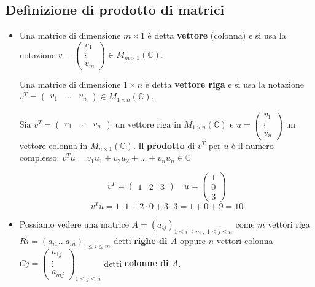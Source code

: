 \documentclass[a4paper]{article}
\theoremstyle{break}
\theoremstyle{break}
\theoremstyle{break}
\theoremstyle{break}
\begin{document}
\subsection{Definizione di prodotto di matrici}
\begin{itemize}
\item Una matrice di dimensione \( m \times 1 \) è detta \textbf{vettore} (colonna) e
si usa la notazione \( v = \begin{pmatrix} v_1 \\ \vdots \\ v_m \end{pmatrix} \in M_{m \times 1}(\mathbb{C})  \).

Una matrice di dimensione \( 1 \times n \) è detta \textbf{vettore riga} e si usa la notazione
\( v^T = \begin{pmatrix} v_1 & \ldots & v_n \end{pmatrix} \in M_{1 \times n}(\mathbb{C}) \).

Sia \( v^T = \begin{pmatrix} v_1 & \ldots & v_n \end{pmatrix} \)  un vettore riga
in \( M_{1 \times n}(\mathbb{C}) \) e \( u = \begin{pmatrix} v_1 \\ \vdots \\ v_n \end{pmatrix} \)
un vettore colonna in \( M_{n \times 1}(\mathbb{C}) \). Il \textbf{prodotto} di \( v^T \) per \( u \) è
il numero complesso: \( v^Tu = v_1u_1 + v_2u_2 + \ldots + v_nu_n \in \mathbb{C} \) 

\begin{example}
  \[
    v^T=\begin{pmatrix} 1 & 2 & 3 \end{pmatrix} \quad u=\begin{pmatrix} 1 \\ 0 \\ 3 \end{pmatrix}
  \] 
  \[
    v^Tu = 1 \cdot 1 + 2 \cdot 0 + 3 \cdot 3 = 1 + 0 + 9 = 10
  \] 
\end{example}
\item Possiamo vedere una matrice \( A=(a_{ij})_{1 \le i \le m\;,\;1 \le j \le n} \)  come \( m \)
vettori riga \( Ri=(a_{i1} \ldots a_{in})_{1 \le i \le m} \) detti \textbf{righe di \( A \)}
oppure \( n \) vettori colonna \( Cj=\begin{pmatrix} a_{1j} \\ \vdots \\ a_{mj} \end{pmatrix} _{1 \le j \le n} \) detti \textbf{colonne di \( A \)}.


\end{itemize}
\end{document}
